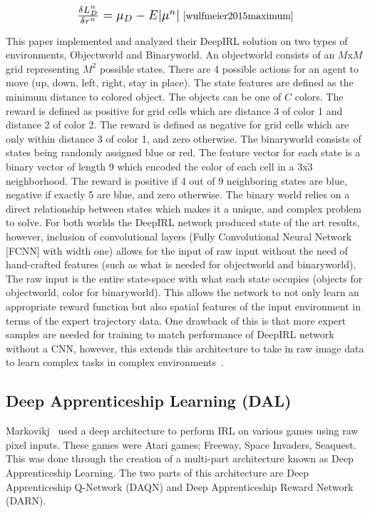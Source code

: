 \documentclass[12pt,american]{report}
\begin{document}
\begin{equation}
            \label{eq:maximum_entropy_gradient}
            \resizebox{0.3\textwidth}{!}{$\frac{\delta L_{D}^{n}}{\delta r^{n}}=\mu_D -  E|\mu^n|$}~\cite{wulfmeier2015maximum}%
        \end{equation}

This paper implemented and analyzed their DeepIRL solution on two types of environments, Objectworld and Binaryworld. An objectworld consists of an $M$x$M$ grid representing $M^2$ possible states.  There are 4 possible actions for an agent to move (up, down, left, right, stay in place). The state features are defined as the minimum distance to colored object.  The objects can be one of $C$ colors. The reward is defined as positive for grid cells which are distance 3 of color 1 and distance 2 of color 2. The reward is defined as negative for grid cells which are only within distance 3 of color 1, and zero otherwise.  The binaryworld consists of states being randomly assigned blue or red.  The feature vector for each state is a binary vector of length 9 which encoded the color of each cell in a 3x3 neighborhood. The reward is positive if 4 out of 9 neighboring states are blue, negative if exactly 5 are blue, and zero otherwise.  The binary world relies on a direct relationship between states which makes it a unique, and complex problem to solve. For both worlds the DeepIRL network produced state of the art results, however, inclusion of convolutional layers (Fully Convolutional Neural Network [FCNN] with width one) allows for the input of raw input without the need of hand-crafted features (such as what is needed for objectworld and binaryworld). The raw input is the entire state-space with what each state occupies (objects for objectworld, color for binaryworld). This allows the network to not only learn an appropriate reward function but also spatial features of the input environment in terms of the expert trajectory data.  One drawback of this is that more expert samples are needed for training to match performance of DeepIRL network without a CNN, however, this extends this architecture to take in raw image data to learn complex tasks in complex environments~\cite{wulfmeier2015maximum}.

\subsection{Deep Apprenticeship Learning (DAL)}
Markovikj~\cite{markovikj2014deep} used a deep architecture to perform IRL on various games using raw pixel inputs. These games were Atari games; Freeway, Space Invaders, Seaquest. This was done through the creation of a multi-part architecture known as Deep Apprenticeship Learning. The two parts of this architecture are Deep Apprenticeship Q-Network (DAQN) and Deep Apprenticeship Reward Network (DARN).
\end{document}
